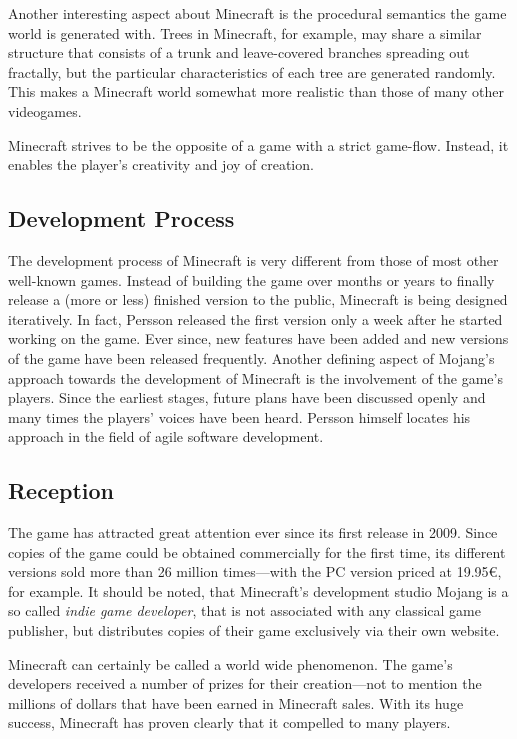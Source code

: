 Another interesting aspect about Minecraft is the procedural semantics the game world is generated with. Trees in Minecraft, for example, may share a similar structure that consists of a trunk and leave-covered branches spreading out fractally, but the particular characteristics of each tree are generated randomly. This makes a Minecraft world somewhat more realistic than those of many other videogames.

Minecraft strives to be the opposite of a game with a strict game-flow. Instead, it enables the player's creativity and joy of creation.

        \subsection{Development Process}
The development process of Minecraft is very different from those of most other well-known games. Instead of building the game over months or years to finally release a (more or less) finished version to the public, Minecraft is being designed iteratively. In fact, Persson released the first version only a week after he started working on the game. Ever since, new features have been added and new versions of the game have been released frequently. Another defining aspect of Mojang's approach towards the development of Minecraft is the involvement of the game's players. Since the earliest stages, future plans have been discussed openly and many times the players' voices have been heard. Persson himself locates his approach in the field of agile software development.

        \subsection{Reception}
The game has attracted great attention ever since its first release in 2009. Since copies of the game could be obtained commercially for the first time, its different versions sold more than 26 million times---with the PC version priced at 19.95\euro, for example. It should be noted, that Minecraft's development studio Mojang is a so called \emph{indie game developer}, that is not associated with any classical game publisher, but distributes copies of their game exclusively via their own website.

Minecraft can certainly be called a world wide phenomenon. The game's developers received a number of prizes for their creation---not to mention the millions of dollars that have been earned in Minecraft sales. With its huge success, Minecraft has proven clearly that it compelled to many players.

